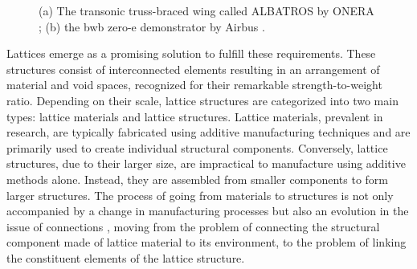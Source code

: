 \begin{figure}
    \hspace*{\fill}
    \hfill
    \hspace*{\fill}
    \caption{(a) The transonic truss-braced wing called ALBATROS by ONERA \cite{carrier_investigation_2012,carrier_multidisciplinary_2021}; (b) the \acrfull{bwb} zero-e demonstrator by Airbus \cite{noauthor_airbus_2021}.}
    \label{fig:01_concepts}
\end{figure}

Lattices emerge as a promising solution to fulfill these requirements. These structures consist of interconnected elements resulting in an arrangement of material and void spaces, recognized for their remarkable strength-to-weight ratio. Depending on their scale, lattice structures are categorized into two main types: lattice materials and lattice structures. Lattice materials, prevalent in research, are typically fabricated using additive manufacturing techniques and are primarily used to create individual structural components. Conversely, lattice structures, due to their larger size, are impractical to manufacture using additive methods alone. Instead, they are assembled from smaller components to form larger structures. The process of going from materials to structures is not only accompanied by a change in manufacturing processes but also an evolution in the issue of connections \ie, moving from the problem of connecting the structural component made of lattice material to its environment, to the problem of linking the constituent elements of the lattice structure.

